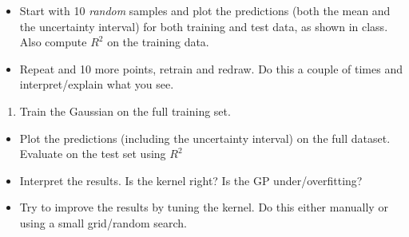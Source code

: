 \documentclass[11pt]{article}
\providecommand{\tightlist}{%
      \setlength{\itemsep}{0pt}\setlength{\parskip}{0pt}}
\begin{document}
\begin{itemize}
\tightlist
\item
  Start with 10 \emph{random} samples and plot the predictions (both the
  mean and the uncertainty interval) for both training and test data, as
  shown in class. Also compute \(R^2\) on the training data.
\item
  Repeat and 10 more points, retrain and redraw. Do this a couple of
  times and interpret/explain what you see.
\end{itemize}

\begin{enumerate}
\def\labelenumi{\arabic{enumi}.}
\setcounter{enumi}{1}
\tightlist
\item
  Train the Gaussian on the full training set.
\end{enumerate}

\begin{itemize}
\tightlist
\item
  Plot the predictions (including the uncertainty interval) on the full
  dataset. Evaluate on the test set using \(R^2\)
\item
  Interpret the results. Is the kernel right? Is the GP
  under/overfitting?
\item
  Try to improve the results by tuning the kernel. Do this either
  manually or using a small grid/random search.
\end{itemize}
\end{document}
